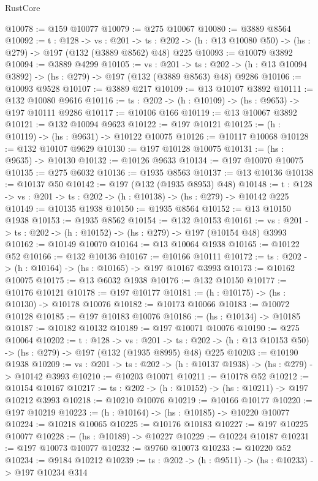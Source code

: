 \begin{lexlean}{RustCore}
\begin{coremodule}
@10078 := @159 @10077
@10079 := @275 @10067
@10080 := @3889 @8564
@10092 := {t : @128} ->
  {vs : @201} ->
  {ts : @202} -> (h : @13 @10080 @50) -> (hs : @279) -> @197 (@132 (@3889 @8562) @48) @225
@10093 := @10079 @3892
@10094 := @3889 @4299
@10105 := {vs : @201} ->
  {ts : @202} -> (h : @13 @10094 @3892) -> (hs : @279) -> @197 (@132 (@3889 @8563) @48) @9286
@10106 := @10093 @9528
@10107 := @3889 @217
@10109 := @13 @10107 @3892
@10111 := @132 @10080 @9616
@10116 := {ts : @202} -> (h : @10109) -> (hs : @9653) -> @197 @10111 @9286
@10117 := @10106 @166
@10119 := @13 @10067 @3892
@10121 := @132 @10094 @9623
@10122 := @197 @10121
@10125 := (h : @10119) -> (hs : @9631) -> @10122 @10075
@10126 := @10117 @10068
@10128 := @132 @10107 @9629
@10130 := @197 @10128 @10075
@10131 := (hs : @9635) -> @10130
@10132 := @10126 @9633
@10134 := @197 @10070 @10075
@10135 := @275 @6032
@10136 := @1935 @8563
@10137 := @13 @10136
@10138 := @10137 @50
@10142 := @197 (@132 (@1935 @8953) @48)
@10148 := {t : @128} -> {vs : @201} -> {ts : @202} -> (h : @10138) -> (hs : @279) -> @10142 @225
@10149 := @10135 @1938
@10150 := @1935 @8564
@10152 := @13 @10150 @1938
@10153 := @1935 @8562
@10154 := @132 @10153
@10161 := {vs : @201} -> {ts : @202} -> (h : @10152) -> (hs : @279) -> @197 (@10154 @48) @3993
@10162 := @10149 @10070
@10164 := @13 @10064 @1938
@10165 := @10122 @52
@10166 := @132 @10136
@10167 := @10166 @10111
@10172 := {ts : @202} -> (h : @10164) -> (hs : @10165) -> @197 @10167 @3993
@10173 := @10162 @10075
@10175 := @13 @6032 @1938
@10176 := @132 @10150
@10177 := @10176 @10121
@10178 := @197 @10177
@10181 := (h : @10175) -> (hs : @10130) -> @10178 @10076
@10182 := @10173 @10066
@10183 := @10072 @10128
@10185 := @197 @10183 @10076
@10186 := (hs : @10134) -> @10185
@10187 := @10182 @10132
@10189 := @197 @10071 @10076
@10190 := @275 @10064
@10202 := {t : @128} ->
  {vs : @201} ->
  {ts : @202} -> (h : @13 @10153 @50) -> (hs : @279) -> @197 (@132 (@1935 @8995) @48) @225
@10203 := @10190 @1938
@10209 := {vs : @201} -> {ts : @202} -> (h : @10137 @1938) -> (hs : @279) -> @10142 @3993
@10210 := @10203 @10071
@10211 := @10178 @52
@10212 := @10154 @10167
@10217 := {ts : @202} -> (h : @10152) -> (hs : @10211) -> @197 @10212 @3993
@10218 := @10210 @10076
@10219 := @10166 @10177
@10220 := @197 @10219
@10223 := (h : @10164) -> (hs : @10185) -> @10220 @10077
@10224 := @10218 @10065
@10225 := @10176 @10183
@10227 := @197 @10225 @10077
@10228 := (hs : @10189) -> @10227
@10229 := @10224 @10187
@10231 := @197 @10073 @10077
@10232 := @9760 @10073
@10233 := @10220 @52
@10234 := @9184 @10212
@10239 := {ts : @202} -> (h : @9511) -> (hs : @10233) -> @197 @10234 @314

\end{coremodule}
\end{lexlean}
